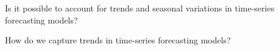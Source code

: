 \begin{exercise}
Is it possible to account for trends and seasonal variations in time-series forecasting models?

\end{exercise}
   

\begin{exercise}
How do we capture trends in time-series forecasting models?

\end{exercise}

